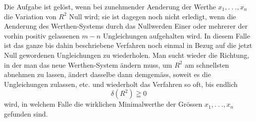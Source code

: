 \indent Die Aufgabe ist gelöst, wenn bei zunehmender Aenderung der Werthe \(x_1,.\ .\ .,x_n\) die Variation von \(R^2\) Null wird; sie ist dagegen noch nicht erledigt, wenn die Aenderung des Werthen-Systems durch das Nullwerden Einer oder mehrerer der vorhin positiv gelassenen \(m-n\) Ungleichungen aufgehalten wird. In diesem Falle ist das ganze bis dahin beschriebene Verfahren noch einmal in Bezug auf die jetzt Null gewordenen Ungleichungen zu wiederholen.
\clearpage{}
\noindent Man sucht wieder die Richtung, in der man das neue Werthen-System ändern muss, um \(R^2\) am schnellsten abnehmen zu lassen, ändert dasselbe dann demgemäss, soweit es die Ungleichungen zulassen, etc. und wiederholt das Verfahren so oft, bis endlich
\[
\delta(R^2)\geqq0
\]
\noindent wird, in welchem Falle die wirklichen Minimalwerthe der Grössen \(x_1,.\ .\ .,x_n\) gefunden sind.
